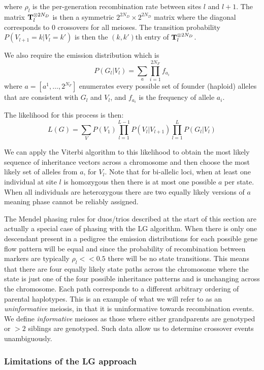where $\rho_l$ is the per-generation recombination rate between sites $l$ and $l+1$. The matrix $\textrm{\textbf{T}}_l^{\otimes 2N_D}$ is then a symmetric $2^{2N_D} \times 2^{2N_D}$ matrix where the diagonal corresponds to 0 crossovers for all meioses.  The transition probability $P(V_{l+1}=k|V_l=k')$ is then the $(k,k')$th entry of $\textrm{\textbf{T}}_l^{\otimes 2N_D}$.  

We also require the emission distribution which is 
$$ P(G_l|V_l)  = \sum_a \prod_{i=1}^{2N_F} f_{a_i}$$
where $a=[a^1,\ldots,2^{N_F}]$ enumerates every possible set of founder (haploid) alleles that are consistent with $G_l$ and $V_l$, and $f_{a_i}$ is the frequency of allele $a_i$.  

The likelihood for this process is then:
$$L(G) = \sum_V P(V_1) \prod_{l=1}^{L-1} P(V_l|V_{l+1}) \prod_{l=1}^L P(G_l|V_l) $$
 
We can apply the Viterbi algorithm to this likelihood to obtain the most likely sequence of inheritance vectors across a chromosome and then choose the most likely set of alleles from  $a$, for $V_l$. Note that for bi-allelic loci, when at least one individual at site $l$ is homozygous then there is at most one possible $a$ per state. When all individuals are heterozygous there are two equally likely versions of $a$ meaning phase cannot be reliably assigned.

The Mendel phasing rules for duos/trios described at the start of this section are actually a special case of phasing with the LG algorithm.  When there is only one descendant present in a pedigree the emission distributions for each possible gene flow pattern will be equal and since the probability of recombination between markers are typically $\rho_l << 0.5$ there will be no state transitions.  This means that there are four equally likely state paths across the chromosome where the state is just one of the four possible inheritance patterns and is unchanging across the chromosome.  Each path corresponds to a different arbitrary ordering of parental haplotypes.  This is an example of what we will refer to as an \emph{uninformative} meiosis, in that it is uninformative towards recombination events. We define \emph{informative} meioses as those where either grandparents are genotyped or $>2$ siblings are genotyped. Such data allow us to determine crossover events unambiguously.

\subsubsection{Limitations of the LG approach}

